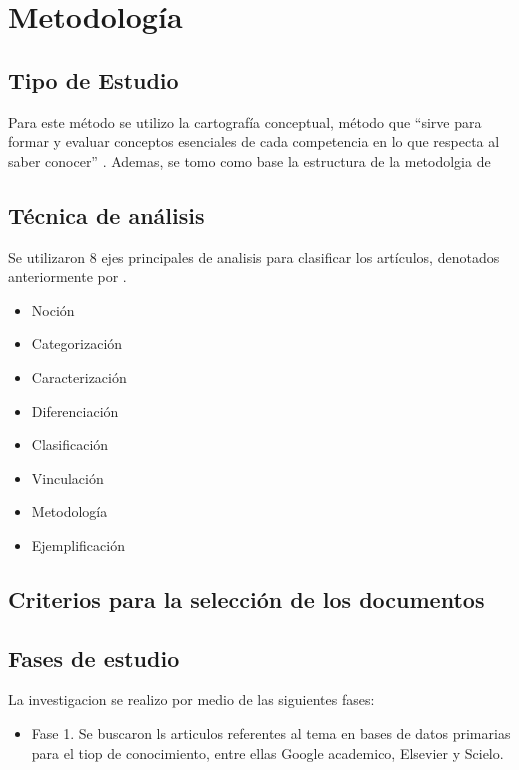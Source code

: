 \section{Metodología}
\subsection{Tipo de Estudio}
Para este método se utilizo la cartografía conceptual, método que “sirve para formar y evaluar conceptos esenciales de cada competencia en lo que respecta al saber conocer” \parencite[][p. 16]{tobon2012}. Ademas, se tomo como base la estructura de la metodolgia de \textcite{guzman2020} 
\subsection{Técnica de análisis}
Se utilizaron 8 ejes principales de analisis para clasificar los artículos, denotados anteriormente por \textcite{tobon2012} .
\begin{itemize}
   \item Noción
   \item Categorización
   \item Caracterización
   \item Diferenciación
   \item Clasificación
   \item Vinculación
   \item Metodología
   \item Ejemplificación
\end{itemize}



\subsection{Criterios para la selección de los documentos}
\subsection{Fases de estudio}

La investigacion se realizo por medio de las siguientes fases:

\begin{itemize}
   \item Fase 1. Se buscaron ls articulos referentes al tema en bases de datos primarias para el tiop de conocimiento, entre ellas Google academico, Elsevier y Scielo.
      
\end{itemize}

%

